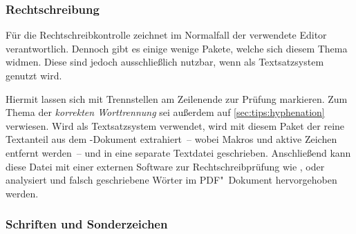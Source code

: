 \subsubsection{%
  Rechtschreibung%
}

Für die Rechtschreibkontrolle zeichnet im Normalfall der verwendete Editor 
verantwortlich. Dennoch gibt es einige wenige Pakete, welche sich diesem Thema 
widmen. Diese sind jedoch ausschließlich nutzbar, wenn als Textsatzsystem 
 genutzt wird.

\begin{DeclarePackages}[Rechtschreibung]
  Hiermit lassen sich mit  Trennstellen am Zeilenende zur 
  Prüfung markieren. Zum Thema der \textit{korrekten Worttrennung} sei außerdem 
  auf \autoref{sec:tips:hyphenation} verwiesen.
  Wird  als Textsatzsystem verwendet, wird mit diesem Paket 
  der reine Textanteil aus dem -Dokument extrahiert~-- wobei 
  Makros und aktive Zeichen entfernt werden~-- und in eine separate Textdatei 
  geschrieben. Anschließend kann diese Datei mit einer externen Software zur 
  Rechtschreibprüfung wie ,  oder 
   analysiert und falsch geschriebene Wörter im 
  PDF"~Dokument hervorgehoben werden.
\end{DeclarePackages}



\subsubsection{Schriften und Sonderzeichen}

